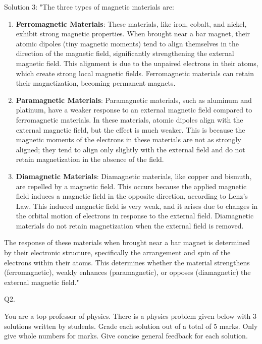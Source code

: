 Solution 3: 
"The three types of magnetic materials are:

\begin{enumerate}
    \item \textbf{Ferromagnetic Materials}: These materials, like iron, cobalt, and nickel, exhibit strong magnetic properties. When brought near a bar magnet, their atomic dipoles (tiny magnetic moments) tend to align themselves in the direction of the magnetic field, significantly strengthening the external magnetic field. This alignment is due to the unpaired electrons in their atoms, which create strong local magnetic fields. Ferromagnetic materials can retain their magnetization, becoming permanent magnets.
    
    \item \textbf{Paramagnetic Materials}: Paramagnetic materials, such as aluminum and platinum, have a weaker response to an external magnetic field compared to ferromagnetic materials. In these materials, atomic dipoles align with the external magnetic field, but the effect is much weaker. This is because the magnetic moments of the electrons in these materials are not as strongly aligned; they tend to align only slightly with the external field and do not retain magnetization in the absence of the field.
    
    \item \textbf{Diamagnetic Materials}: Diamagnetic materials, like copper and bismuth, are repelled by a magnetic field. This occurs because the applied magnetic field induces a magnetic field in the opposite direction, according to Lenz's Law. This induced magnetic field is very weak, and it arises due to changes in the orbital motion of electrons in response to the external field. Diamagnetic materials do not retain magnetization when the external field is removed.
\end{enumerate}

The response of these materials when brought near a bar magnet is determined by their electronic structure, specifically the arrangement and spin of the electrons within their atoms. This determines whether the material strengthens (ferromagnetic), weakly enhances (paramagnetic), or opposes (diamagnetic) the external magnetic field."



                               Q2. 

You are a top professor of physics. There is a physics problem given below with 3 solutions written by students. Grade each solution out of a total of 5 marks. Only give whole numbers for marks. Give concise general feedback for each solution. 

